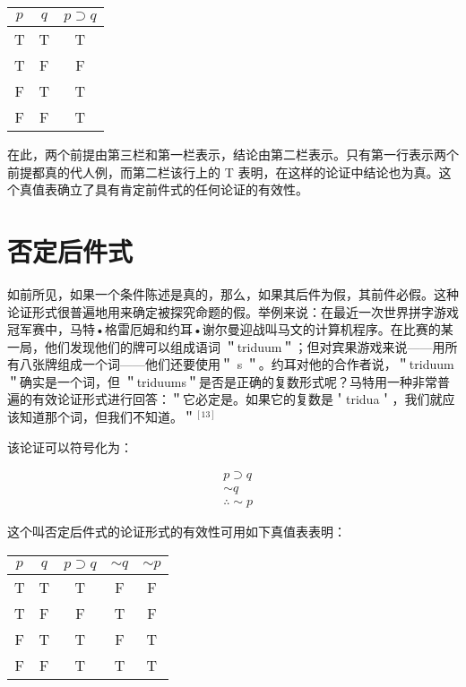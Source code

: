 \begin{center}
\begin{tabular}{|ccc|}
\hline
$p$ & $q$ & $p \supset q$ \\
\hline
T & T & T \\
T & F & F \\
F & T & T \\
F & F & T \\
\hline
\end{tabular}
\end{center}

在此，两个前提由第三栏和第一栏表示，结论由第二栏表示。只有第一行表示两个前提都真的代人例，而第二栏该行上的 T 表明，在这样的论证中结论也为真。这个真值表确立了具有肯定前件式的任何论证的有效性。

\section*{否定后件式}
如前所见，如果一个条件陈述是真的，那么，如果其后件为假，其前件必假。这种论证形式很普遍地用来确定被探究命题的假。举例来说：在最近一次世界拼字游戏冠军赛中，马特•格雷厄姆和约耳•谢尔曼迎战叫马文的计算机程序。在比赛的某一局，他们发现他们的牌可以组成语词 ＂triduum＂；但对宾果游戏来说——用所有八张牌组成一个词——他们还要使用＂ s ＂。约耳对他的合作者说，＂triduum＂确实是一个词，但 ＂triduums＂是否是正确的复数形式呢？马特用一种非常普遍的有效论证形式进行回答：＂它必定是。如果它的复数是＇tridua＇，我们就应该知道那个词，但我们不知道。＂${ }^{[13]}$

该论证可以符号化为：

$$
\begin{aligned}
& p \supset q \\
& \sim q \\
& \therefore \sim p
\end{aligned}
$$

这个叫否定后件式的论证形式的有效性可用如下真值表表明：

\begin{center}
\begin{tabular}{|ccccc|}
\hline
$p$ & $q$ & $p \supset q$ & $\sim q$ & $\sim p$ \\
\hline
T & T & T & F & F \\
T & F & F & T & F \\
F & T & T & F & T \\
F & F & T & T & T \\
\hline
\end{tabular}
\end{center}

